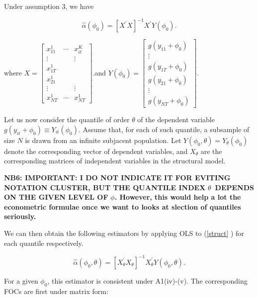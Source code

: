 \documentclass[a4paper,notitlepage,thmsb,11pt]{article}
\begin{document}
Under assumption 3, we have

\begin{equation*}
\hat{\alpha}(\phi _{0})=\left[ X^{\prime }X\right] ^{-1}X^{\prime }Y(\phi
_{0}).
\end{equation*}

where $X=\left[ 
\begin{array}{ccc}
x_{11}^{1} & \cdots  & x_{it}^{K} \\ 
\vdots  &  & \vdots  \\ 
x_{1T}^{1} &  &  \\ 
x_{21}^{1} &  &  \\ 
\vdots  &  & \vdots  \\ 
x_{NT}^{1} & \cdots  & x_{NT}^{1}%
\end{array}%
\right] $.and $Y(\phi _{0})=\left[ 
\begin{array}{c}
g(y_{11}+\phi _{0}) \\ 
\vdots  \\ 
g(y_{1T}+\phi _{0}) \\ 
g(y_{21}+\phi _{0}) \\ 
\vdots  \\ 
g(y_{NT}+\phi _{0})%
\end{array}%
\right] $.

Let us now consider the quantile of order $\theta $ of the dependent
variable $g(y_{it}+\phi _{0})\equiv Y_{it}(\phi _{0})$. Assume that, for
each of such quantile, a subsample of size $N$ is drawn from an infinite
subjacent population. Let $Y(\phi _{0},\theta )=Y_{\theta }(\phi _{0})$
denote the corresponding vector of dependent variables, and $X_{\theta }$
are the corresponding matrices of independent variables in the structural
model.

\textbf{NB6: IMPORTANT: I DO NOT INDICATE IT FOR EVITING NOTATION CLUSTER,
BUT THE QUANTILE INDEX }$\theta $\textbf{\ DEPENDS ON THE GIVEN LEVEL OF }$%
\phi $\textbf{. However, this would help a lot the econometric formulae once
we want to looks at slection of quantiles seriously.}

We can then obtain the following estimators by applying OLS to (\ref{struct}%
) for each quantile respectively.

\begin{equation}
\hat{\alpha}(\phi _{0},\theta )=\left[ X_{\theta }^{\prime }X_{\theta }%
\right] ^{-1}X_{\theta }^{\prime }Y(\phi _{0},\theta ).  \label{alpha_theta}
\end{equation}

For a given $\phi _{0}$, this estimator is consistent under A1(iv)-(v). The
corresponding FOCs are first under matrix form:
\end{document}
